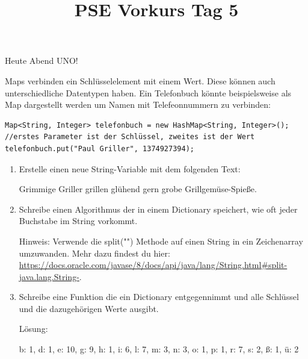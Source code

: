 \documentclass{../../sheet}
\title{PSE Vorkurs Tag 5}
\begin{document}
\maketitle
Heute Abend UNO!

\newpage
{}
Maps verbinden ein Schlüsselelement mit einem Wert. Diese können auch unterschiedliche Datentypen haben. Ein Telefonbuch könnte beispielsweise als Map dargestellt werden um Namen mit Telefeonnummern zu verbinden:
\begin{verbatim}
Map<String, Integer> telefonbuch = new HashMap<String, Integer>();
//erstes Parameter ist der Schlüssel, zweites ist der Wert
telefonbuch.put("Paul Griller", 1374927394);
\end{verbatim}

\begin{enumerate}
    \item Erstelle einen neue String-Variable mit dem folgenden Text:
    \begin{ausgabe}
        Grimmige Griller grillen glühend gern grobe Grillgemüse-Spieße.
    \end{ausgabe}
    \item Schreibe einen Algorithmus der in einem Dictionary speichert, wie oft jeder Buchstabe im String vorkommt. 

    Hinweis: Verwende die split("") Methode auf einen String in ein Zeichenarray umzuwanden. Mehr dazu findest du hier: \url{https://docs.oracle.com/javase/8/docs/api/java/lang/String.html#split-java.lang.String-}.

    \item Schreibe eine Funktion die ein Dictionary entgegennimmt und alle Schlüssel und die dazugehörigen Werte ausgibt.
    
    Lösung:
    \begin{ausgabe}
        b: 1, d: 1, e: 10, g: 9, h: 1, i: 6, l: 7, m: 3, n: 3, o: 1, p: 1, r: 7, s: 2, ß: 1, ü: 2
    \end{ausgabe}
\end{enumerate}
\end{document}

